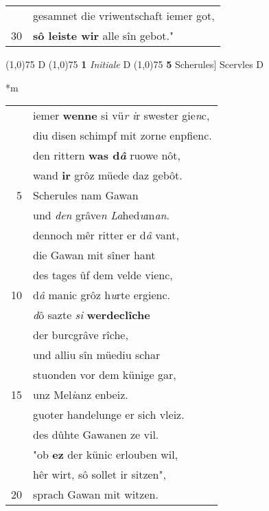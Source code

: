 \documentclass[8pt,a4paper,notitlepage]{article}
\begin{document}
\begin{table}[ht]
\begin{minipage}[t]{0.5\linewidth}
\begin{tabular}{rl}
 & gesamnet die vriwentschaft iemer got,\\ 
30 & \textbf{sô leiste wir} alle sîn gebot."\\ 
\end{tabular}
\scriptsize
\line(1,0){75} \newline
D \newline
\line(1,0){75} \newline
\textbf{1} \textit{Initiale} D  \newline
\line(1,0){75} \newline
\textbf{5} Scherules] Scervles D \newline
\end{minipage}
\hspace{0.5cm}
\begin{minipage}[t]{0.5\linewidth}
\small
\begin{center}*m
\end{center}
\begin{tabular}{rl}
 & iemer \textbf{wenne} si vü\textit{r i}r swester gie\textit{n}c,\\ 
 & diu disen schimpf mit zorne enpfienc.\\ 
 & den rittern \textbf{was d\textit{â}} ruowe nôt,\\ 
 & wand \textbf{ir} grôz müede daz gebôt.\\ 
5 & Scherules nam Gawan\\ 
 & und \textit{den} grâve\textit{n} \textit{La}hed\textit{u}m\textit{an}.\\ 
 & dennoch mêr ritter er d\textit{â} vant,\\ 
 & die Gawan mit sîner hant\\ 
 & des tages ûf dem velde vienc,\\ 
10 & d\textit{â} manic grôz h\textit{u}rte ergienc.\\ 
 & \textit{d}ô sazte \textit{si} \textbf{werdeclîche}\\ 
 & der burcgrâve rîche,\\ 
 & und alliu sîn müediu schar\\ 
 & stuonden vor dem künige gar,\\ 
15 & unz Mel\textit{i}anz enbeiz.\\ 
 & guoter handelunge er sich vleiz.\\ 
 & des dûhte Gawanen ze vil.\\ 
 & "ob \textbf{ez} der künic erlouben wil,\\ 
 & hêr wirt, sô sollet ir sitzen",\\ 
20 & sprach Gawan mit witzen.\\ 

\end{tabular}
\end{minipage}
\end{table}
\end{document}
